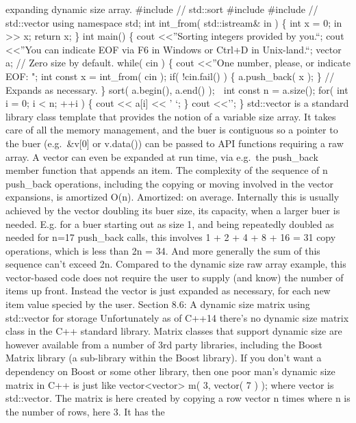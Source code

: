 expanding dynamic size array. \#include // std::sort \#include \#include
// std::vector using namespace std; int int\_from( std::istream\& in )
\{ int x = 0; in \textgreater\textgreater{} x; return x; \} int main()
\{ cout \textless\textless{}''Sorting integers provided by you.\n``;
cout \textless\textless{}''You can indicate EOF via F6 in Windows or
Ctrl+D in Unix-land.\n``; vector a; // Zero size by default. while( cin
) \{ cout \textless\textless{}''One number, please, or indicate EOF: ";
int const x = int\_from( cin ); if( !cin.fail() ) \{ a.push\_back( x );
\} // Expands as necessary. \} sort( a.begin(), a.end() );  int const n
= a.size(); for( int i = 0; i \textless{} n; ++i ) \{ cout
\textless\textless{} a{[}i{]} \textless\textless{} ' `; \} cout
\textless\textless{}'\n'; \} std::vector is a standard library class
template that provides the notion of a variable size array. It takes
care of all the memory management, and the buer is contiguous so a
pointer to the buer (e.g.~\&v{[}0{]} or v.data()) can be passed to API
functions requiring a raw array. A vector can even be expanded at run
time, via e.g.~the push\_back member function that appends an item. The
complexity of the sequence of n push\_back operations, including the
copying or moving involved in the vector expansions, is amortized O(n).
Amortized: on average. Internally this is usually achieved by the vector
doubling its buer size, its capacity, when a larger buer is needed. E.g.
for a buer starting out as size 1, and being repeatedly doubled as
needed for n=17 push\_back calls, this involves 1 + 2 + 4 + 8 + 16 = 31
copy operations, which is less than 2n = 34. And more generally the sum
of this sequence can't exceed 2n. Compared to the dynamic size raw array
example, this vector-based code does not require the user to supply (and
know) the number of items up front. Instead the vector is just expanded
as necessary, for each new item value specied by the user. Section 8.6:
A dynamic size matrix using std::vector for storage Unfortunately as of
C++14 there's no dynamic size matrix class in the C++ standard library.
Matrix classes that support dynamic size are however available from a
number of 3rd party libraries, including the Boost Matrix library (a
sub-library within the Boost library). If you don't want a dependency on
Boost or some other library, then one poor man's dynamic size matrix in
C++ is just like vector\textless vector\textgreater{} m( 3, vector( 7 )
); where vector is std::vector. The matrix is here created by copying a
row vector n times where n is the number of rows, here 3. It has the
